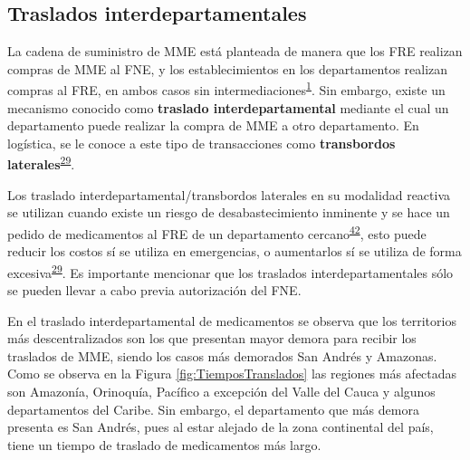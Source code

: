 \documentclass[
]{book}
\begin{document}
\hypertarget{traslados-interdepartamentales}{%
\subsection{Traslados interdepartamentales}\label{traslados-interdepartamentales}}

La cadena de suministro de MME está planteada de manera que los FRE realizan compras de MME al FNE, y los establecimientos en los departamentos realizan compras al FRE, en ambos casos sin intermediaciones\textsuperscript{\protect\hyperlink{ref-MSPS1478-2006}{1}}. Sin embargo, existe un mecanismo conocido como \textbf{traslado interdepartamental} mediante el cual un departamento puede realizar la compra de MME a otro departamento. En logística, se le conoce a este tipo de transacciones como \textbf{transbordos laterales}\textsuperscript{\protect\hyperlink{ref-Silver2017}{29}}.

Los traslado interdepartamental/transbordos laterales en su modalidad reactiva se utilizan cuando existe un riesgo de desabastecimiento inminente y se hace un pedido de medicamentos al FRE de un departamento cercano\textsuperscript{\protect\hyperlink{ref-Paterson2011}{42}}, esto puede reducir los costos sí se utiliza en emergencias, o aumentarlos sí se utiliza de forma excesiva\textsuperscript{\protect\hyperlink{ref-Silver2017}{29}}. Es importante mencionar que los traslados interdepartamentales sólo se pueden llevar a cabo previa autorización del FNE.

En el traslado interdepartamental de medicamentos se observa que los territorios más descentralizados son los que presentan mayor demora para recibir los traslados de MME, siendo los casos más demorados San Andrés y Amazonas. Como se observa en la Figura \ref{fig:TiemposTranslados} las regiones más afectadas son Amazonía, Orinoquía, Pacífico a excepción del Valle del Cauca y algunos departamentos del Caribe. Sin embargo, el departamento que más demora presenta es San Andrés, pues al estar alejado de la zona continental del país, tiene un tiempo de traslado de medicamentos más largo.
\end{document}
